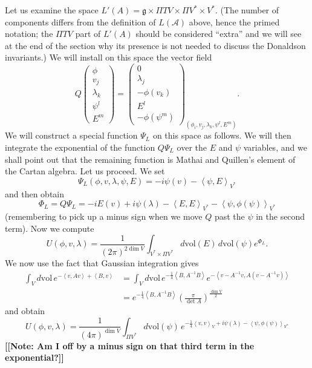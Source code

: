 \documentclass[twoside]{amsart}
\newcommand{\gc}[1]{{\bf [[Note: {#1}]]}}
\newcommand{\enm}[1]{\ensuremath{#1}}
\renewcommand{\aa}{\enm{\mathcal{A}}}
\newcommand{\g}{\enm{\mathfrak{g}}}
\newcommand{\ip}[2]{\enm{\left<#1,#2\right>}}
\begin{document}
Let us examine the space \( L'(A) = \g\times\Pi TV\times \Pi
V^{*}\times V^{*}.  \) (The number of components differs from the
definition of \( L(\aa) \) above, hence the primed notation; the \(
\Pi TV \) part of \( L'(A) \) should be considered ``extra'' and we
will see at the end of the section why its presence is not needed to
discuss the Donaldson invariants.)  We will install on this space the
vector field
\begin{equation}
    Q\left(
    \begin{array}{c}
	\phi \\
	v_{j} \\
	\lambda_{k} \\
	\psi^{l} \\
	E^{m}
    \end{array}
    \right) = \left(
    \begin{array}{c}
	0 \\
	\lambda_{j} \\
	-\phi(v_{k}) \\
	E^{l} \\
	-\phi(\psi^{m})
    \end{array}\right)_{(\phi_{i},v_{j},\lambda_{k},\psi^{l},E^{m})}.
    \label{eq:qlocalization}
\end{equation}
We will construct a special function \( \Psi_{L} \) on this space as
follows.  We will then integrate the exponential of the function \(
Q\Psi_{L} \) over the \( E \) and \( \psi \) variables, and we
shall
point out that the remaining function is Mathai and Quillen's element
of the Cartan algebra.  Let us proceed.  We set
\begin{equation}
    \Psi_{L}(\phi, v, \lambda, \psi, E) = -i\psi(v)
    -\ip{\psi}{E}_{V^{*}}
    \label{eq:psilocalization}
\end{equation}
and then obtain
\begin{equation}
    \Phi_{L} = Q\Psi_{L} = -iE(v) + i\psi(\lambda) -
    \ip{E}{E}_{V^{*}} - \ip{\psi}{\phi(\psi)}_{V^{*}}
    \label{eq:philocalization1}
\end{equation}
(remembering to pick up a minus sign when we move \( Q \) past the \(
\psi \) in the second term).  Now we compute
\[ U(\phi, v, \lambda) = \frac{1}{(2\pi)^{2\dim V}}
\int_{V^{*}\times \Pi V^{*}}d\mathrm{vol}(E)\,d\mathrm{vol}(\psi)
e^{\Phi_{L}}. \]
We now use the fact that Gaussian integration gives
\begin{align}
    \int_{V}d\mathrm{vol}\,e^{-\ip{v}{Av} + \ip{B}{v}}
    &= \int_{V}d\mathrm{vol}\,e^{-\frac{1}{4}\ip{B}{A^{-1}B}}
    e^{-\ip{v-A^{-1}v}{A(v-A^{-1}v)}} \\
    &= e^{-\frac{1}{4}\ip{B}{A^{-1}B}} \left(
    \frac{\pi}{\det A}
    \right)^{\frac{\dim V}{2}}
    \label{eq:gaussian}
\end{align}
and obtain
\begin{equation}
    U(\phi, v, \lambda) = \frac{1}{(4\pi)^{\dim V}} \int_{\Pi
    V^{*}}d\mathrm{vol}(\psi)\,e^{-\frac{1}{4}\ip{v}{v}_{V}
    + i\psi(\lambda)
    -\ip{\psi}{\phi(\psi)}_{V^{*}}}
    \label{eq:philocalization}
\end{equation}
\gc{Am I off by a minus sign on that third term in the exponential?}
\end{document}
